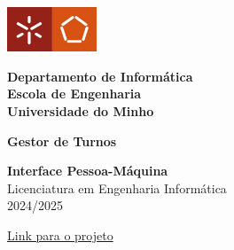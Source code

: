 \documentclass{article}
\begin{document}
\begin{titlepage}
    \begin{flushleft}
        \includegraphics[width=0.2\textwidth]{logo.png}
    \end{flushleft}    
    \begin{flushleft}
        \textbf{Departamento de Informática} \\
        \textbf{Escola de Engenharia} \\
        \textbf{Universidade do Minho}
    \end{flushleft}    
    \vspace{2cm}

    \begin{center}
        {\Huge \textbf{Gestor de Turnos}} \\
        \vspace{0.5cm}
    \end{center}
    
    \begin{center}
        \textbf{Interface Pessoa-Máquina} \\
        Licenciatura em Engenharia Informática \\
        2024/2025
    \end{center}

    \begin{center}
    \href{https://www.figma.com/design/8PO30QoW6AGILm8vvlVg2B/SWAP2?t=lgVA4g5Cron9eMVb-1}{Link para o projeto}
    \end{center}


\end{titlepage}
\end{document}

